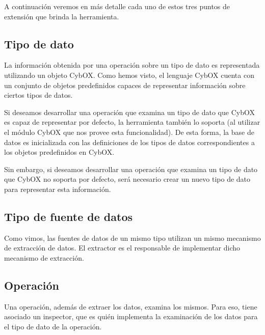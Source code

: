 A continuación veremos en más detalle cada uno de estos tres puntos de extensión que brinda la herramienta.

\subsection{Tipo de dato}
La información obtenida por una operación sobre un tipo de dato es representada utilizando un objeto CybOX. Como hemos visto, el lenguaje CybOX cuenta con un conjunto de objetos predefinidos capaces de representar información sobre ciertos tipos de datos.

Si deseamos desarrollar una operación que examina un tipo de dato que CybOX es capaz de representar por defecto, la herramienta también lo soporta (al utilizar el módulo CybOX que nos provee esta funcionalidad). De esta forma, la base de datos es inicializada con las definiciones de los tipos de datos correspondientes a los objetos predefinidos en CybOX.

Sin embargo, si deseamos desarrollar una operación que examina un tipo de dato que CybOX no soporta por defecto, será necesario crear un nuevo tipo de dato para representar esta información.

\subsection{Tipo de fuente de datos}
Como vimos, las fuentes de datos de un mismo tipo utilizan un mismo mecanismo de extracción de datos. El extractor es el responsable de implementar dicho mecanismo de extracción.

\subsection{Operación}
Una operación, además de extraer los datos, examina los mismos. Para eso, tiene asociado un inspector, que es quién implementa la examinación de los datos para el tipo de dato de la operación.
